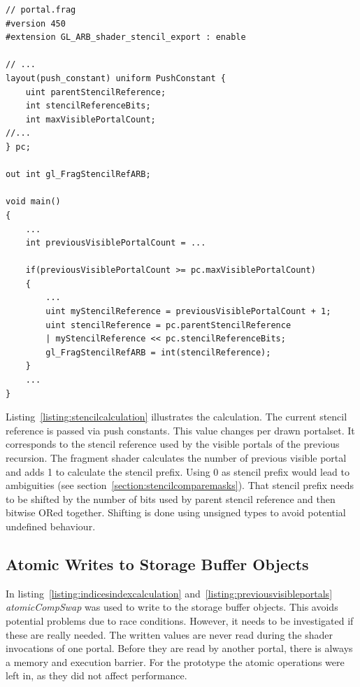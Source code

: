 \begin{lstlisting}[caption={Calculate Stencil Reference in Shader}, label=listing:stencilcalculation]
// portal.frag
#version 450
#extension GL_ARB_shader_stencil_export : enable

// ...
layout(push_constant) uniform PushConstant {	
	uint parentStencilReference;
	int stencilReferenceBits;
	int maxVisiblePortalCount;
//...
} pc;

out int gl_FragStencilRefARB;

void main()
{
	...
	int previousVisiblePortalCount = ...
	
	if(previousVisiblePortalCount >= pc.maxVisiblePortalCount)
	{
		...
		uint myStencilReference = previousVisiblePortalCount + 1;
		uint stencilReference = pc.parentStencilReference 
		| myStencilReference << pc.stencilReferenceBits;
		gl_FragStencilRefARB = int(stencilReference);
	}	
	...
}
\end{lstlisting}

Listing~\ref{listing:stencilcalculation} illustrates the calculation. The current stencil reference is passed via push constants. This value changes per drawn \gls{portalset}. It corresponds to the stencil reference used by the visible portals of the previous recursion. The fragment shader calculates the number of previous visible portal and adds 1 to calculate the stencil prefix. Using 0 as stencil prefix would lead to ambiguities (see section~\ref{section:stencilcomparemasks}). That stencil prefix needs to be shifted by the number of bits used by parent stencil reference and then bitwise ORed together. Shifting is done using unsigned types to avoid potential undefined behaviour.

\subsection{Atomic Writes to Storage Buffer Objects}
In listing~\ref{listing:indicesindexcalculation} and~\ref{listing:previousvisibleportals} \textit{atomicCompSwap} was used to write to the storage buffer objects. This avoids potential problems due to race conditions. However, it needs to be investigated if these are really needed. The written values are never read during the shader invocations of one portal. Before they are read by another portal, there is always a memory and execution barrier. For the prototype the atomic operations were left in, as they did not affect performance.

